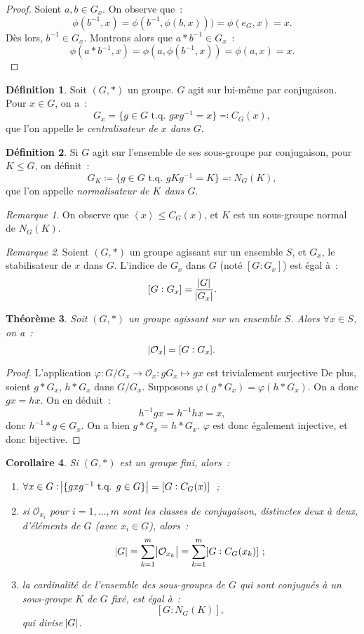 \documentclass{article}
\newtheorem{thm}{Théorème}[section]
\newtheorem{cor}[thm]{Corollaire}
\theoremstyle{definition}
\newtheorem{déf}[thm]{Définition}
\theoremstyle{remark}
\newtheorem*{rmq}{Remarque}
\newcommand{\tq}{\text{ t.q. }}
\newcommand{\eng}[1]{\left\langle#1\right\rangle}
\begin{document}
	\begin{proof} Soient $a, b \in G_x$. On observe que~:
	\[\phi(b^{-1}, x) = \phi(b^{-1}, \phi(b, x))) = \phi(e_G, x) = x.\]
	Dès lors, $b^{-1} \in G_x$. Montrons alors que $a*b^{-1} \in G_x$~:
	\[\phi(a*b^{-1}, x) = \phi(a, \phi(b^{-1}, x)) = \phi(a, x) = x.\]
	\end{proof}

	\begin{déf} Soit $(G, *)$ un groupe. $G$ agit sur lui-même par conjugaison. Pour $x \in G$, on a~:
	\[G_x = \{g \in G \tq gxg^{-1} = x\} \eqqcolon C_G(x),\]
	que l'on appelle le \textit{centralisateur de $x$ dans $G$}.
	\end{déf}

	\begin{déf} Si $G$ agit sur l'ensemble de ses sous-groupe par conjugaison, pour $K \leq G$, on définit~:
	\[G_K \coloneqq \{g \in G \tq gKg^{-1} = K\} \eqqcolon N_G(K),\]
	que l'on appelle \textit{normalisateur de $K$ dans $G$}.
	\end{déf}

	\begin{rmq} On observe que $\eng x \leq C_G(x)$, et $K$ est un sous-groupe normal de $N_G(K)$.
	\end{rmq}

	\begin{rmq} Soient $(G, *)$ un groupe agissant sur un ensemble $S$, et $G_x$, le stabilisateur de $x$ dans $G$. L'indice de $G_x$ dans $G$ (noté $[G:G_x]$)
	est égal à~:
	\[[G:G_x] = \frac {\abs G}{\abs {G_x}}.\]
	\end{rmq}

	\begin{thm} Soit $(G, *)$ un groupe agissant sur un ensemble $S$. Alors $\forall x \in S$, on a~:
	\[\abs {\mathcal O_x} = [G:G_x].\]
	\end{thm}

	\begin{proof} L'application $\varphi : G/G_x \to \mathcal O_x : gG_x \mapsto gx$ est trivialement surjective
	De plus, soient $g*G_x$, $h*G_x$ dans $G/G_x$. Supposons $\varphi(g*G_x) = \varphi(h*G_x)$. On a donc $gx = hx$. On en déduit~:
	\[h^{-1}gx = h^{-1}hx = x,\]
	donc $h^{-1}*g \in G_x$. On a bien $g*G_x = h*G_x$. $\varphi$ est donc également injective, et donc bijective.
	\end{proof}

	\begin{cor} Si $(G, *)$ est un groupe fini, alors~:
	\begin{enumerate}
		\item $\forall x \in G : \abs {\{gxg^{-1} \tq g \in G\}} = [G:C_G(x)]$~;
		\item si $\mathcal O_{x_i}$ pour $i=1, \ldots, m$ sont les classes de conjugaison, distinctes deux à deux, d'éléments de $G$ (avec $x_i \in G$), alors~:
		\[\abs G = \sum_{k=1}^m\abs {\mathcal O_{x_k}} = \sum_{k=1}^m[G:C_G(x_k)]~;\]
		\item la cardinalité de l'ensemble des sous-groupes de $G$ qui sont conjugués à un sous-groupe $K$ de $G$ fixé, est égal à~:
		\[[G:N_G(K)],\]
		qui divise $\abs G$.
	\end{enumerate}
	\end{cor}
\end{document}
